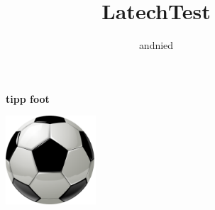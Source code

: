 \documentclass[10pt,a4paper]{article}
\author{andnied}
\title{LatechTest}
\begin{document}
\maketitle

\begin{figure}[hbtp]
  \centering
	\huge{\textbf{tipp foot}}  
\end{figure}



\begin{figure}[hbtp]
  \centering
   \includegraphics[width=0.3\textwidth]{football.png}
\end{figure}
\end{document}

